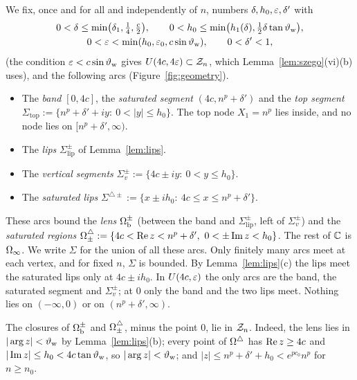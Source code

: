 We fix, once and for all and independently of $n$, numbers $\delta,h_0,\varepsilon,\delta'$ with
\begin{gather*}
  0<\delta\le\min\bigl(\delta_1,\tfrac14,\tfrac c2\bigr),\qquad 0<h_0\le\min\bigl(h_1(\delta),\tfrac12\delta\tan\vartheta_{\mathrm{w}}\bigr),\\
  0<\varepsilon<\min(h_0,\varepsilon_0,c\sin\vartheta_{\mathrm{w}}),\qquad 0<\delta'<1,
\end{gather*}
(the condition $\varepsilon<c\sin\vartheta_{\mathrm{w}}$ gives $U(4c,4\varepsilon)\subset\mathcal{Z}_n$, which Lemma~\ref{lem:szego}(vi)(b) uses), and the
following arcs (Figure~\ref{fig:geometry}).
\begin{itemize}
\item The \emph{band} $[0,4c]$, the \emph{saturated segment} $(4c,n^p+\delta')$ and the \emph{top segment}
  $\Sigma_{\mathrm{top}}:=\{n^p+\delta'+iy:\ 0<|y|\le h_0\}$. The top node $X_1=n^p$ lies inside, and no node lies on
  $[n^p+\delta',\infty)$.
\item The \emph{lips} $\Sigma_{\mathrm{lip}}^\pm$ of Lemma~\ref{lem:lips}.
\item The \emph{vertical segments} $\Sigma_v^\pm:=\{4c\pm iy:\ 0<y\le h_0\}$.
\item The \emph{saturated lips} $\Sigma^{\triangle\pm}:=\{x\pm ih_0:\ 4c\le x\le n^p+\delta'\}$.
\end{itemize}
These arcs bound the \emph{lens} $\Omega_{\mathrm{b}}^\pm$ (between the band and $\Sigma^\pm_{\mathrm{lip}}$, left of
$\Sigma^\pm_v$) and the \emph{saturated regions} $\Osat_\pm:=\{4c<\re z<n^p+\delta',\ 0<\pm\im z<h_0\}$. The rest of
$\mathbb{C}$ is $\Omega_{\infty}$. We write $\Sigma$ for the union of all these arcs. Only finitely many arcs meet at each vertex, and
for fixed $n$, $\Sigma$ is bounded. By Lemma~\ref{lem:lips}(c) the lips meet the saturated lips only at $4c\pm ih_0$. In
$U(4c,\varepsilon)$ the only arcs are the band, the saturated segment and $\Sigma^\pm_v$; at $0$ only the band and the two lips
meet. Nothing lies on $(-\infty,0)$ or on $(n^p+\delta',\infty)$.

The closures of $\Omega_{\mathrm{b}}^\pm$ and $\Omega^{\triangle}_\pm$, minus the point $0$, lie in $\mathcal{Z}_n$. Indeed, the lens lies in
$|\arg z|<\vartheta_{\mathrm{w}}$ by Lemma~\ref{lem:lips}(b); every point of $\Omega^{\triangle}$ has $\operatorname{Re} z\ge4c$ and $|\operatorname{Im} z|\le h_0<4c\tan\vartheta_{\mathrm{w}}$,
so $|\arg z|<\vartheta_{\mathrm{w}}$; and $|z|\le n^p+\delta'+h_0<e^{pc_0}n^p$ for $n\ge n_0$.

